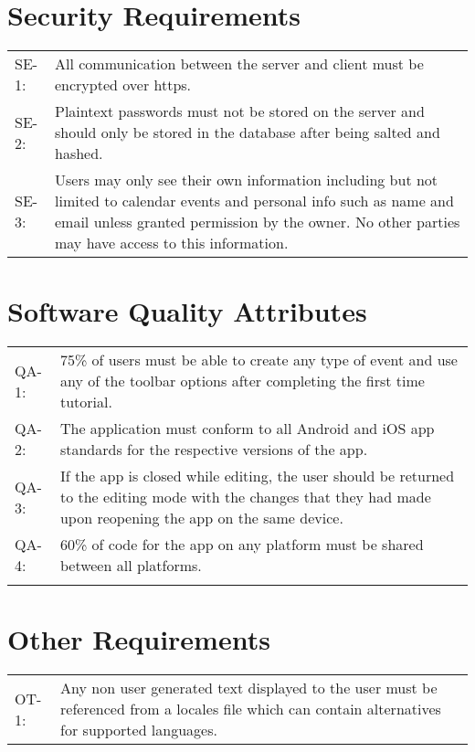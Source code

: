\documentclass{scrreprt}
\begin{document}
\section{Security Requirements}
\begin{center}
\begin{tabular}{ p{1.5cm} p{13cm} }
SE-1: & All communication between the server and client must be encrypted over https.\\
SE-2: & Plaintext passwords must not be stored on the server and should only be
stored in the database after being salted and hashed.\\
SE-3: & Users may only see their own information including but not limited to calendar
events and personal info such as name and email unless granted permission by the owner.
No other parties may have access to this information.
\end{tabular}
\end{center}

\section{Software Quality Attributes}
\begin{center}
\begin{tabular}{ p{1.5cm} p{13cm} }
QA-1: & 75\% of users must be able to create any type of event and use any of the
toolbar options after completing the first time tutorial.\\
QA-2: & The application must conform to all Android and iOS app standards for the
respective versions of the app.\\
QA-3: & If the app is closed while editing, the user should be returned to the editing
mode with the changes that they had made upon reopening the app on the same device.\\
QA-4: & 60\% of code for the app on any platform must be shared between all platforms.\\\\
\end{tabular}
\end{center}

\section{Other Requirements}
\begin{center}
\begin{tabular}{ p{1.5cm} p{13cm} }
OT-1: & Any non user generated text displayed to the user must be referenced from
a locales file which can contain alternatives for supported languages.\\
\end{tabular}
\end{center}
\end{document}

